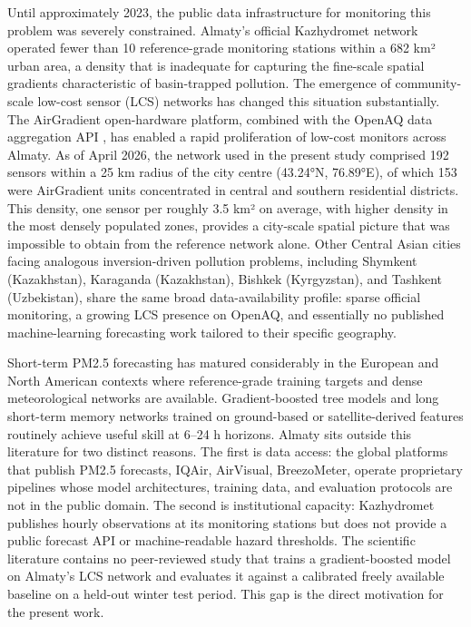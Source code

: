 Until approximately 2023, the public data infrastructure for monitoring this problem was severely constrained. Almaty's official Kazhydromet network operated fewer than 10 reference-grade monitoring stations within a 682 km² urban area, a density that is inadequate for capturing the fine-scale spatial gradients characteristic of basin-trapped pollution. The emergence of community-scale low-cost sensor (LCS) networks has changed this situation substantially. The AirGradient open-hardware platform, combined with the OpenAQ data aggregation API \cite{openaq_platform}, has enabled a rapid proliferation of low-cost monitors across Almaty. As of April 2026, the network used in the present study comprised 192 sensors within a 25 km radius of the city centre (43.24°N, 76.89°E), of which 153 were AirGradient units concentrated in central and southern residential districts. This density, one sensor per roughly 3.5 km² on average, with higher density in the most densely populated zones, provides a city-scale spatial picture that was impossible to obtain from the reference network alone. Other Central Asian cities facing analogous inversion-driven pollution problems, including Shymkent (Kazakhstan), Karaganda (Kazakhstan), Bishkek (Kyrgyzstan), and Tashkent (Uzbekistan), share the same broad data-availability profile: sparse official monitoring, a growing LCS presence on OpenAQ, and essentially no published machine-learning forecasting work tailored to their specific geography.

Short-term PM2.5 forecasting has matured considerably in the European and North American contexts where reference-grade training targets and dense meteorological networks are available. Gradient-boosted tree models and long short-term memory networks trained on ground-based or satellite-derived features routinely achieve useful skill at 6--24 h horizons. Almaty sits outside this literature for two distinct reasons. The first is data access: the global platforms that publish PM2.5 forecasts, IQAir, AirVisual, BreezoMeter, operate proprietary pipelines whose model architectures, training data, and evaluation protocols are not in the public domain. The second is institutional capacity: Kazhydromet publishes hourly observations at its monitoring stations but does not provide a public forecast API or machine-readable hazard thresholds. The scientific literature contains no peer-reviewed study that trains a gradient-boosted model on Almaty's LCS network and evaluates it against a calibrated freely available baseline on a held-out winter test period. This gap is the direct motivation for the present work.

